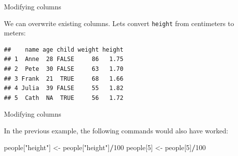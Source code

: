 \documentclass[ignorenonframetext,]{beamer}
\newenvironment{Shaded}{\begin{snugshade}}{\end{snugshade}}
\newcommand{\DecValTok}[1]{\textcolor[rgb]{0.00,0.00,0.81}{#1}}
\newcommand{\NormalTok}[1]{#1}
\newcommand{\OperatorTok}[1]{\textcolor[rgb]{0.81,0.36,0.00}{\textbf{#1}}}
\newcommand{\StringTok}[1]{\textcolor[rgb]{0.31,0.60,0.02}{#1}}
\begin{document}
\begin{frame}[fragile]{Modifying columns}
\protect\hypertarget{modifying-columns}{}

We can overwrite existing columns. Lets convert \texttt{height} from
centimeters to meters:

\begin{Shaded}
\end{Shaded}

\begin{verbatim}
##    name age child weight height
## 1  Anne  28 FALSE     86   1.75
## 2  Pete  30 FALSE     63   1.70
## 3 Frank  21  TRUE     68   1.66
## 4 Julia  39 FALSE     55   1.82
## 5  Cath  NA  TRUE     56   1.72
\end{verbatim}

\end{frame}

\begin{frame}[fragile]{Modifying columns}
\protect\hypertarget{modifying-columns-1}{}

In the previous example, the following commands would also have worked:

\begin{Shaded}
\begin{Highlighting}[]
\NormalTok{people[}\StringTok{"height"}\NormalTok{] <-}\StringTok{ }\NormalTok{people[}\StringTok{"height"}\NormalTok{]}\OperatorTok{/}\DecValTok{100}
\NormalTok{people[}\DecValTok{5}\NormalTok{] <-}\StringTok{ }\NormalTok{people[}\DecValTok{5}\NormalTok{]}\OperatorTok{/}\DecValTok{100}
\end{Highlighting}
\end{Shaded}

\end{frame}
\end{document}
